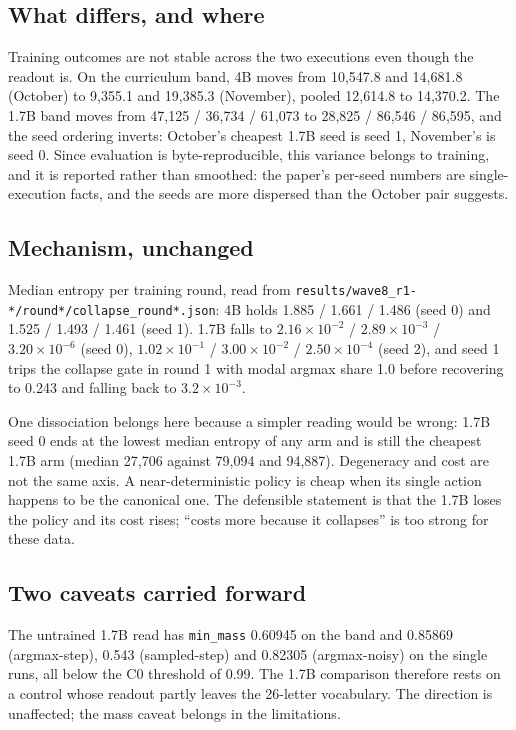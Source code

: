 \documentclass[11pt,a4paper]{article}
\begin{document}
\subsection*{What differs, and where}

Training outcomes are not stable across the two executions even though the readout is. On the
curriculum band, 4B moves from 10{,}547.8 and 14{,}681.8 (October) to 9{,}355.1 and 19{,}385.3
(November), pooled 12{,}614.8 to 14{,}370.2. The 1.7B band moves from 47{,}125 / 36{,}734 / 61{,}073
to 28{,}825 / 86{,}546 / 86{,}595, and the seed ordering inverts: October's cheapest 1.7B seed is
seed 1, November's is seed 0. Since evaluation is byte-reproducible, this variance belongs to training,
and it is reported rather than smoothed: the paper's per-seed numbers are single-execution facts, and
the seeds are more dispersed than the October pair suggests.

\subsection*{Mechanism, unchanged}

Median entropy per training round, read from
\texttt{results/wave8\_r1-*/round*/collapse\_round*.json}: 4B holds 1.885 / 1.661 / 1.486 (seed 0) and
1.525 / 1.493 / 1.461 (seed 1). 1.7B falls to $2.16\times10^{-2}$ / $2.89\times10^{-3}$ /
$3.20\times10^{-6}$ (seed 0), $1.02\times10^{-1}$ / $3.00\times10^{-2}$ / $2.50\times10^{-4}$ (seed 2),
and seed 1 trips the collapse gate in round 1 with modal argmax share 1.0 before recovering to 0.243
and falling back to $3.2\times10^{-3}$.

One dissociation belongs here because a simpler reading would be wrong: 1.7B seed 0 ends at the lowest
median entropy of any arm and is still the cheapest 1.7B arm (median 27{,}706 against 79{,}094 and
94{,}887). Degeneracy and cost are not the same axis. A near-deterministic policy is cheap when its
single action happens to be the canonical one. The defensible statement is that the 1.7B loses the
policy and its cost rises; ``costs more because it collapses'' is too strong for these data.

\subsection*{Two caveats carried forward}

The untrained 1.7B read has \texttt{min\_mass} 0.60945 on the band and 0.85869 (argmax-step), 0.543
(sampled-step) and 0.82305 (argmax-noisy) on the single runs, all below the C0 threshold of 0.99. The
1.7B comparison therefore rests on a control whose readout partly leaves the 26-letter vocabulary. The
direction is unaffected; the mass caveat belongs in the limitations.
\end{document}
